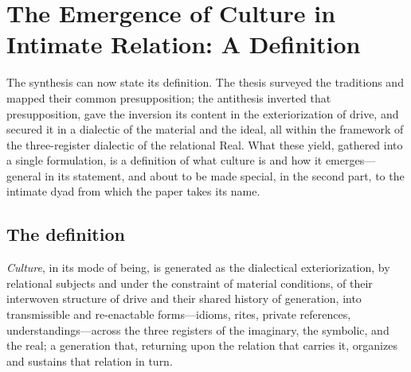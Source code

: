 \section{The Emergence of Culture in Intimate Relation: A Definition}
\label{p24:sec:definition}

\noindent
The synthesis can now state its definition. The thesis surveyed the traditions and mapped their common presupposition; the antithesis inverted that presupposition, gave the inversion its content in the exteriorization of drive, and secured it in a dialectic of the material and the ideal, all within the framework of the three-register dialectic of the relational Real. What these yield, gathered into a single formulation, is a definition of what culture is and how it emerges---general in its statement, and about to be made special, in the second part, to the intimate dyad from which the paper takes its name.

\subsection*{The definition}

\begin{claim}[Definition]
\emph{Culture}, in its mode of being, is generated as the dialectical exteriorization, by relational subjects and under the constraint of material conditions, of their interwoven structure of drive and their shared history of generation, into transmissible and re-enactable forms---idioms, rites, private references, understandings---across the three registers of the imaginary, the symbolic, and the real; a generation that, returning upon the relation that carries it, organizes and sustains that relation in turn.
\end{claim}


